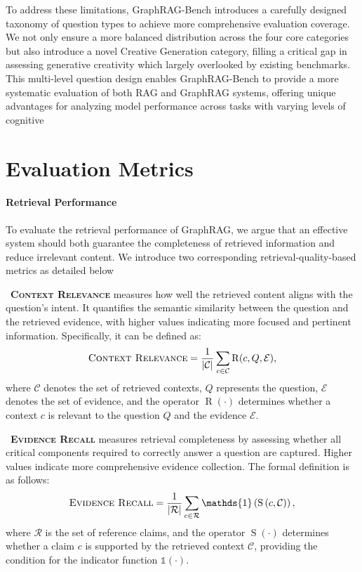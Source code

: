 \documentclass{article} %
\begin{document}
To address these limitations, GraphRAG-Bench introduces a carefully designed taxonomy of question types to achieve more comprehensive evaluation coverage. We not only ensure a more balanced distribution across the four core categories but also introduce a novel Creative Generation category, filling a critical gap in assessing generative creativity which largely overlooked by existing benchmarks. This multi-level question design enables GraphRAG-Bench to provide a more systematic evaluation of both RAG and GraphRAG systems, offering unique advantages for analyzing model performance across tasks with varying levels of cognitive 

\section{Evaluation Metrics}\label{sec:appendix_evaluation}
\paragraph{Retrieval Performance}
To evaluate the retrieval performance of GraphRAG, we argue that an
effective system should both guarantee the completeness of retrieved information and reduce irrelevant content. We introduce two corresponding retrieval-quality-based metrics as detailed below

\noindent\textbullet\ \textbf{\textsc{Context Relevance}} measures how well the retrieved content aligns with the question’s intent. It quantifies the semantic similarity between the question and the retrieved evidence, with higher values indicating more focused and pertinent information. Specifically, it can be defined as: 
\begin{equation}
\textsc{Context Relevance} = \frac{1}{|\mathcal{C}|} \sum_{c \in \mathcal{C}} \operatorname{R}(c, Q, \mathcal{E}),
\end{equation}
\noindent
where $\mathcal{C}$ denotes the set of retrieved contexts, $Q$ represents the question, $\mathcal{E}$ denotes the set of evidence, and the operator $\operatorname{R}(\cdot)$ determines whether a context $c$ is relevant to the question $Q$ and the evidence $\mathcal{E}$.

\noindent\textbullet\ \textbf{\textsc{Evidence Recall}} measures retrieval completeness by assessing whether all critical components required to correctly answer a question are captured. Higher values indicate more comprehensive evidence collection. The formal definition is as follows:
\begin{equation}
\textsc{Evidence Recall} = \frac{1}{|\mathcal{R}|} \sum_{c \in \mathcal{R}} \mathds{1}\left(\operatorname{S}\left(c, \mathcal{C}\right)\right),
\end{equation}
\noindent
where $\mathcal{R}$ is the set of reference claims, and the operator $\operatorname{S}(\cdot)$ determines whether a claim $c$ is supported by the retrieved context $\mathcal{C}$, providing the condition for the indicator function $\mathds{1}(\cdot)$.
\end{document}
